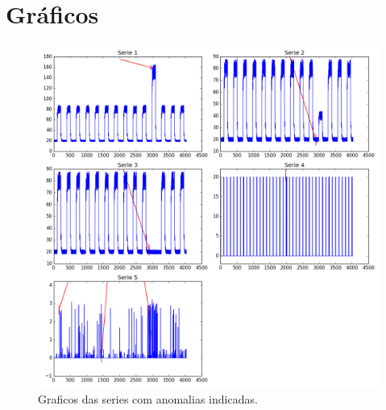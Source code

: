 \documentclass{article}
\begin{document}
\newpage

\section{Gráficos}
\begin{figure}[H]
  \centering
    \includegraphics[scale=0.65]{graficos.png}
    \caption{Graficos das series com anomalias indicadas.}
\end{figure}
\end{document}
